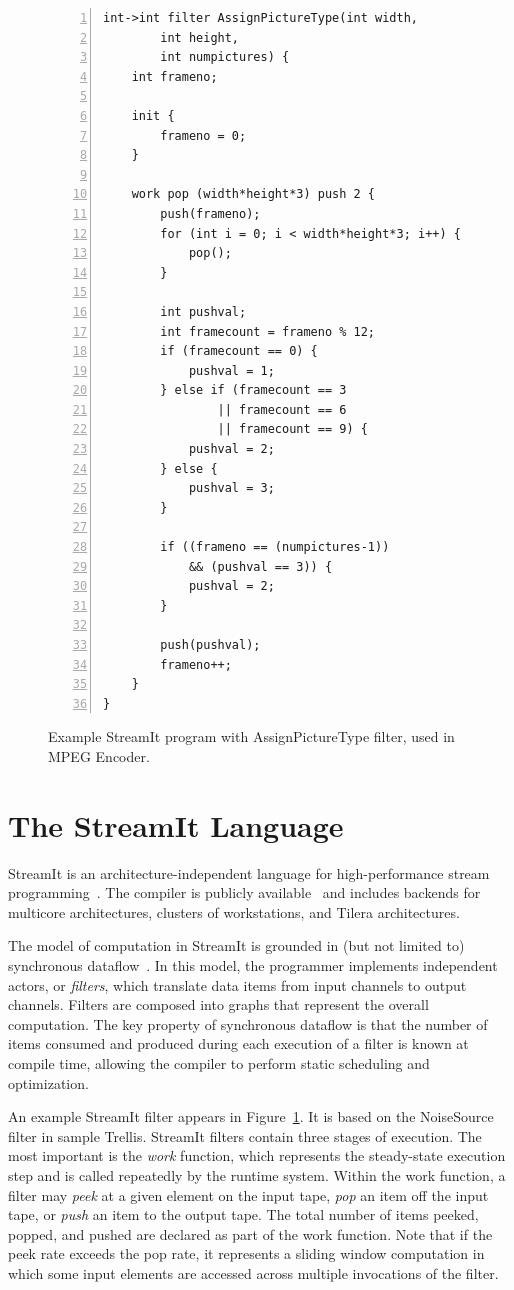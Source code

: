 \begin{figure}[t]
\eightpoint
\begin{Verbatim}[numbers = left]
int->int filter AssignPictureType(int width, 
        int height, 
        int numpictures) {
    int frameno;

    init {
        frameno = 0;
    }

    work pop (width*height*3) push 2 {
        push(frameno);
        for (int i = 0; i < width*height*3; i++) {
            pop();
        }

        int pushval;
        int framecount = frameno % 12;
        if (framecount == 0) {
            pushval = 1;
        } else if (framecount == 3 
                || framecount == 6 
                || framecount == 9) {
            pushval = 2;
        } else {
            pushval = 3;
        }

        if ((frameno == (numpictures-1)) 
            && (pushval == 3)) {
            pushval = 2;
        }

        push(pushval);
        frameno++;
    }
}
\end{Verbatim}

\caption{Example StreamIt program with AssignPictureType filter, used in MPEG Encoder.\protect\label{fig:apt-pipeline}}
\end{figure}

\section{The StreamIt Language}
\label{sec:streamit}

StreamIt is an architecture-independent language for high-performance
stream programming~\cite{thies-cc02}.  The compiler is publicly
available~\cite{streamitweb} and includes backends for multicore
architectures, clusters of workstations, and Tilera architectures.

The model of computation in StreamIt is grounded in (but not limited
to) synchronous dataflow~\cite{lee87}.  In this model, the programmer
implements independent actors, or {\it filters}, which translate data
items from input channels to output channels.  Filters are composed
into graphs that represent the overall computation.  The key property
of synchronous dataflow is that the number of items consumed and
produced during each execution of a filter is known at compile time,
allowing the compiler to perform static scheduling and optimization.

An example StreamIt filter appears in Figure~\ref{fig:apt-pipeline}.
It is based on the NoiseSource filter in sample Trellis.
StreamIt filters contain three stages of execution.  The most
important is the {\it work} function, which represents the
steady-state execution step and is called repeatedly by the runtime
system.  Within the work function, a filter may {\it peek} at a given
element on the input tape, {\it pop} an item off the input tape, or
{\it push} an item to the output tape.  The total number of items
peeked, popped, and pushed are declared as part of the work function.
Note that if the peek rate exceeds the pop rate, it represents a
sliding window computation in which some input elements are accessed
across multiple invocations of the filter.

